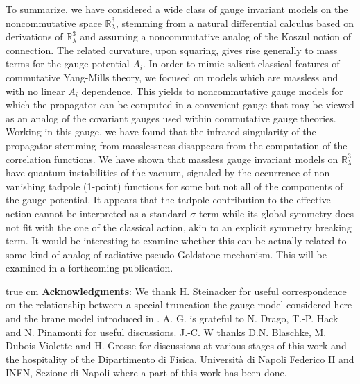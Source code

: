 \documentclass[a4paper,11pt]{article}
\numberwithin{equation}{section}
\theoremstyle{nonumberplain}
\begin{document}
To summarize, we have considered a wide class of gauge invariant models on the noncommutative space $\mathbb{R}^3_\lambda$, stemming from a natural differential calculus based on derivations of $\mathbb{R}^3_\lambda$ and assuming a noncommutative analog of the Koszul notion of connection. The related curvature, upon squaring, gives rise generally to mass terms for the gauge potential $A_i$. In order to mimic salient classical features of commutative Yang-Mills theory, we focused on models which are massless and with no linear $A_i$ dependence. This yields to noncommutative gauge models for which the propagator can be computed in a convenient gauge that may be viewed as an analog of the covariant gauges used within commutative gauge theories. Working in this gauge, we have found that the infrared singularity of the propagator stemming from masslessness disappears from the computation of the correlation functions. We have shown that massless gauge invariant models on $\mathbb{R}^3_\lambda$ have quantum instabilities of the vacuum, signaled by the occurrence of non vanishing tadpole (1-point) functions for some but not all of the components of the gauge potential. It appears that the tadpole contribution to the effective action cannot be interpreted as a standard $\sigma$-term while its global symmetry does not fit with the one of the classical action, akin to an explicit symmetry breaking term. It would be interesting to examine whether this can be actually related to some kind of analog of radiative pseudo-Goldstone mechanism. This will be examined in a forthcoming publication.\par 

 true cm
{\bf{Acknowledgments}}: We thank H. Steinacker for useful correspondence on the relationship between a special truncation the gauge model considered here and the brane model introduced in \cite{ARS00}. A. G. is grateful to N. Drago, T.-P. Hack and N. Pinamonti for useful discussions. J.-C. W thanks D.N. Blaschke, M. Dubois-Violette and H. Grosse for discussions at various stages of this work and the hospitality of the Dipartimento di Fisica, Universit\`a di Napoli Federico II and INFN, Sezione di Napoli where a part of this work has been done.


\setcounter{section}{0}
\appendix
\end{document}
